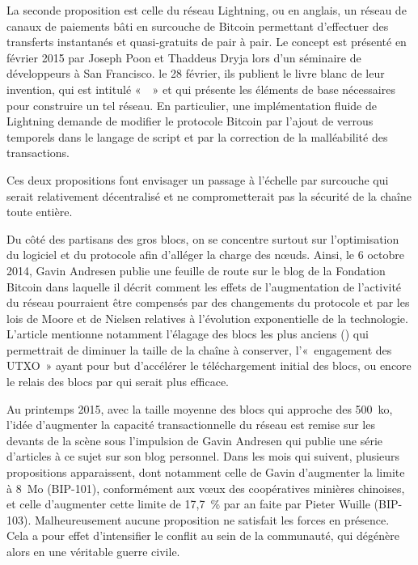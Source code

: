 La seconde proposition est celle du réseau Lightning, ou  en anglais, un réseau de canaux de paiements bâti en surcouche de Bitcoin permettant d'effectuer des transferts instantanés et quasi-gratuits de pair à pair. Le concept est présenté en février 2015 par Joseph Poon et Thaddeus Dryja lors d'un séminaire de développeurs à San Francisco. le 28 février, ils publient le livre blanc de leur invention, qui est intitulé «~~» et qui présente les éléments de base nécessaires pour construire un tel réseau. En particulier, une implémentation fluide de Lightning demande de modifier le protocole Bitcoin par l'ajout de verrous temporels dans le langage de script et par la correction de la malléabilité des transactions.

Ces deux propositions font envisager un passage à l'échelle par surcouche qui serait relativement décentralisé et ne comprometterait pas la sécurité de la chaîne toute entière.

Du côté des partisans des gros blocs, on se concentre surtout sur l'optimisation du logiciel et du protocole afin d'alléger la charge des nœuds. Ainsi, le 6 octobre 2014, Gavin Andresen publie une feuille de route sur le blog de la Fondation Bitcoin dans laquelle il décrit comment les effets de l'augmentation de l'activité du réseau pourraient être compensés par des changements du protocole et par les lois de Moore et de Nielsen relatives à l'évolution exponentielle de la technologie. L'article mentionne notamment l'élagage des blocs les plus anciens () qui permettrait de diminuer la taille de la chaîne à conserver, l'«~engagement des UTXO~» ayant pour but d'accélérer le téléchargement initial des blocs, ou encore le relais des blocs par  qui serait plus efficace.

Au printemps 2015, avec la taille moyenne des blocs qui approche des 500~ko, l'idée d'augmenter la capacité transactionnelle du réseau est remise sur les devants de la scène sous l'impulsion de Gavin Andresen qui publie une série d'articles à ce sujet sur son blog personnel. Dans les mois qui suivent, plusieurs propositions apparaissent, dont notamment celle de Gavin d'augmenter la limite à 8~Mo (BIP-101), conformément aux vœux des coopératives minières chinoises, et celle d'augmenter cette limite de 17,7~\% par an faite par Pieter Wuille (BIP-103). Malheureusement aucune proposition ne satisfait les forces en présence. Cela a pour effet d'intensifier le conflit au sein de la communauté, qui dégénère alors en une véritable guerre civile.

